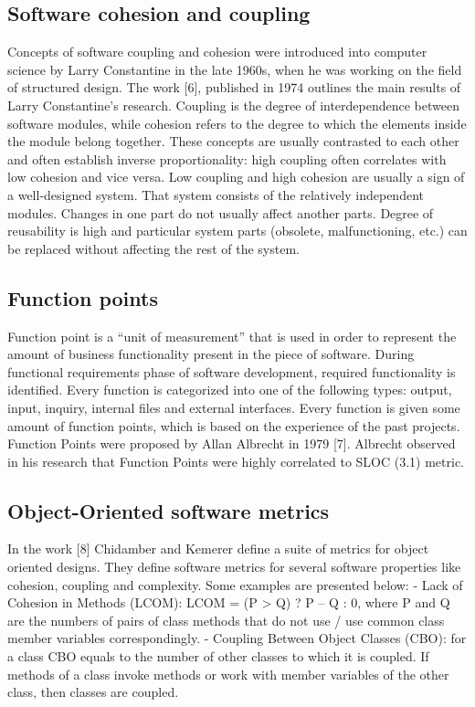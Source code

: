 \subsection{Software cohesion and coupling}
Concepts of software coupling and cohesion were introduced into computer
science by Larry Constantine in the late 1960s, when he was working on the field of structured design. The work [6], published in 1974 outlines the main results of Larry Constantine's research. Coupling is the degree of interdependence between software modules, while cohesion refers to the degree to which the elements inside the module belong together. These concepts are usually contrasted to each other and often establish inverse proportionality: high coupling often correlates with low cohesion and vice versa. Low coupling and high cohesion are usually a sign of a well-designed system. That system consists of the relatively independent modules. Changes in one part do not usually affect another parts. Degree of reusability is high and particular
system parts (obsolete, malfunctioning, etc.) can be replaced without affecting the rest of the system.

\subsection{Function points}
\qquad Function point is a “unit of measurement” that is used in order to represent the amount of business functionality present in the piece of software. During functional requirements phase of software development, required functionality is identified. Every function is categorized into one of the following types: output, input, inquiry, internal files and external interfaces. Every function is given some amount of function points, which is based on the experience of the past projects. Function Points were proposed by Allan Albrecht in 1979 [7]. Albrecht observed in his research that Function Points were highly correlated to SLOC (3.1) metric.

\subsection{Object-Oriented software metrics}
\qquad In the work [8] Chidamber and Kemerer define a suite of metrics for object oriented designs. They define software metrics for several software properties like cohesion, coupling and complexity. Some examples are presented below:
- Lack of Cohesion in Methods (LCOM): LCOM = (P > Q) ? P – Q : 0, where P
and Q are the numbers of pairs of class methods that do not use / use common class member variables correspondingly.
- Coupling Between Object Classes (CBO): for a class CBO equals to the number
of other classes to which it is coupled. If methods of a class invoke methods or work with member variables of the other class, then classes are coupled.

